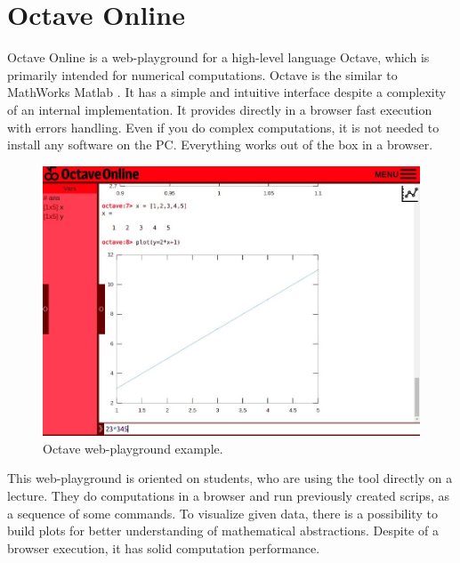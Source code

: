 \section{Octave Online} \label{sec:octave}
Octave Online \cite{Octave} is a web-playground for a high-level language Octave, which is primarily intended for numerical computations. Octave is the similar to MathWorks Matlab \cite{Matlab}. It has a simple and intuitive interface despite a complexity of an internal implementation. It provides directly in a browser fast execution with errors handling. Even if you do complex computations, it is not needed to install any software on the PC. Everything works out of the box in a browser.
\begin{figure}[h!]
    \centering
    \includegraphics[width=0.7\linewidth]{src/pic/octave}
    \caption{Octave web-playground example.}
    \label{fig:octave}
\end{figure}
This web-playground is oriented on students, who are using the tool directly on a lecture. They do computations in a browser and run previously created scrips, as a sequence of some commands. To visualize given data, there is a possibility to build plots for better understanding of mathematical abstractions. Despite of a browser execution, it has solid computation performance.

